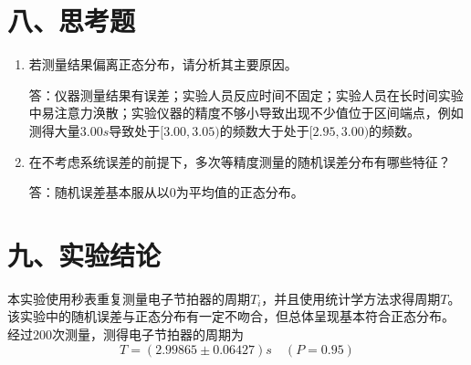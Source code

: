 \documentclass[11pt]{article}
\begin{document}
\section*{八、思考题}

\begin{enumerate}
    
    \item 若测量结果偏离正态分布，请分析其主要原因。
    
    答：仪器测量结果有误差；实验人员反应时间不固定；实验人员在长时间实验中易注意力涣散；实验仪器的精度不够小导致出现不少值位于区间端点，例如测得大量$3.00s$导致处于$[3.00,3.05)$的频数大于处于$[2.95,3.00)$的频数。
    
    \item 在不考虑系统误差的前提下，多次等精度测量的随机误差分布有哪些特征？

    答：随机误差基本服从以$0$为平均值的正态分布。

\end{enumerate}

\section*{九、实验结论}

本实验使用秒表重复测量电子节拍器的周期$T_i$，并且使用统计学方法求得周期$T$。该实验中的随机误差与正态分布有一定不吻合，但总体呈现基本符合正态分布。
经过$200$次测量，测得电子节拍器的周期为
$$
T=(2.99865\pm0.06427)s\quad(P=0.95)
$$
\end{document}
